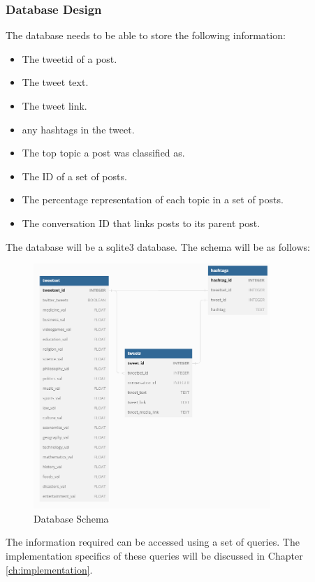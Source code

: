 \subsubsection{Database Design}
The database needs to be able to store the following information:
\begin{itemize}
    \item The tweetid of a post.
    \item The tweet text.
    \item The tweet link.
    \item any hashtags in the tweet.
    \item The top topic a post was classified as.
    \item The ID of a set of posts.
    \item The percentage representation of each topic in a set of posts.
    \item The conversation ID that links posts to its parent post.
\end{itemize}
The database will be a sqlite3 database. The schema will be as follows:
\begin{figure}
    \centering
    \includegraphics[width=0.8\textwidth]{../images/database.png}
    \caption{Database Schema}
    \label{fig:database}
\end{figure}
The information required can be accessed using a set of queries. The implementation specifics of these queries will be discussed in Chapter \ref{ch:implementation}.
